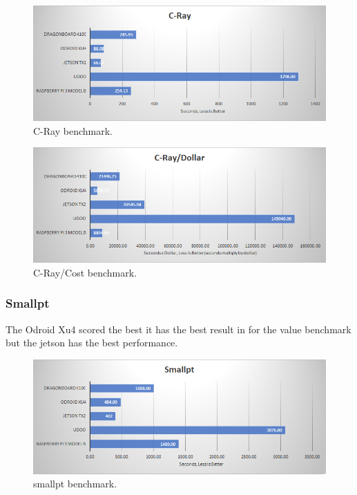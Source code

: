 \documentclass[english]{book_template} %
\begin{document}
\begin{figure}[H]
\center
\caption{C-Ray benchmark.\label{fig:cray}}
\includegraphics[scale=1]{./resultphoronix/cray.png}
\end{figure} 

\begin{figure}[H]
\center
\caption{C-Ray/Cost benchmark.\label{fig:cray_cost}}
\includegraphics[scale=1]{./resultphoronix/cray_cost.png}
\end{figure} 

\subsubsection{Smallpt}

The Odroid Xu4 scored the best it has the best result in for the value benchmark but the jetson has the best performance. 


\begin{figure}[H]
\center
\caption{smallpt benchmark.\label{fig:smallpt}}
\includegraphics[scale=1]{./resultphoronix/smallpt.png}
\end{figure} 
\end{document}
